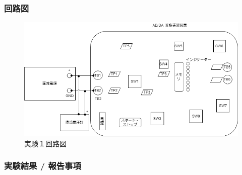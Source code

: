 \documentclass[10pt]{article}
\begin{document}
\subsubsection{回路図}
	\begin{figure}[H]
		\centering
		\includegraphics[width=1\textwidth]{exp1.png}
		\caption{実験１回路図}
	\end{figure}
\pagebreak

\subsubsection{実験結果 / 報告事項}
\end{document}
